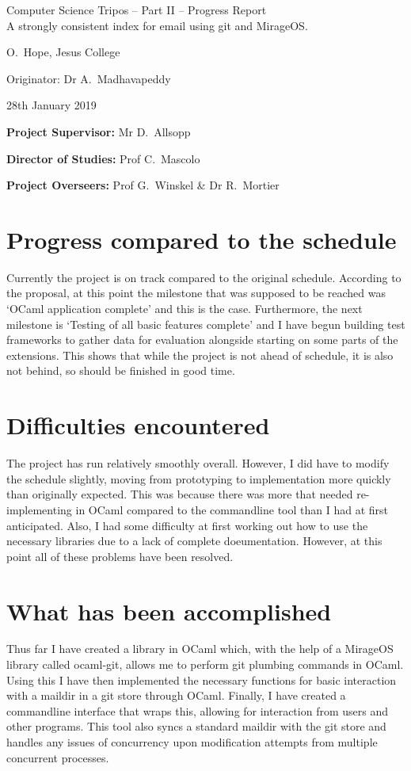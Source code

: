 \documentclass[12pt,a4paper,twoside]{article}
\begin{document}
\begin{center}
    \Large
    Computer Science Tripos -- Part II -- Progress Report\\[4mm]
    \LARGE
    A strongly consistent index for email using git and MirageOS.

    \large
    O.~Hope, Jesus College

    Originator: Dr A.~Madhavapeddy

    28th January 2019
\end{center}

\vspace{5mm}

\textbf{Project Supervisor:} Mr D.~Allsopp

\textbf{Director of Studies:} Prof C.~Mascolo

\textbf{Project Overseers:} Prof G.~Winskel \& Dr R.~Mortier


\section*{Progress compared to the schedule}

Currently the project is on track compared to the original schedule. According to the proposal, at this point the milestone that was supposed to be reached was `OCaml application complete' and this is the case. Furthermore, the next milestone is `Testing of all basic features complete' and I have begun building test frameworks to gather data for evaluation alongside starting on some parts of the extensions. This shows that while the project is not ahead of schedule, it is also not behind, so should be finished in good time.

\section*{Difficulties encountered}

The project has run relatively smoothly overall. However, I did have to modify the schedule slightly, moving from prototyping to implementation more quickly than originally expected. This was because there was more that needed re-implementing in OCaml compared to the commandline tool than I had at first anticipated. Also, I had some difficulty at first working out how to use the necessary libraries due to a lack of complete doeumentation. However, at this point all of these problems have been resolved.

\section*{What has been accomplished}

Thus far I have created a library in OCaml which, with the help of a MirageOS library called ocaml-git, allows me to perform git plumbing commands in OCaml. Using this I have then implemented the necessary functions for basic interaction with a maildir in a git store through OCaml. Finally, I have created a commandline interface that wraps this, allowing for interaction from users and other programs. This tool also syncs a standard maildir with the git store and handles any issues of concurrency upon modification attempts from multiple concurrent processes.
\end{document}
